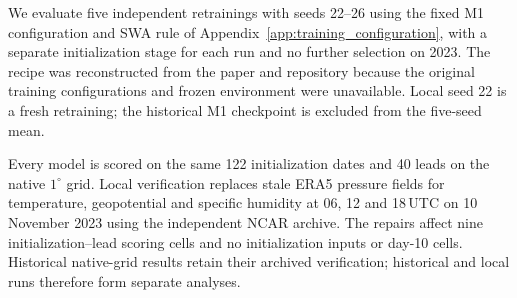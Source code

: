 \documentclass{article}
\newcommand{\vfourchange}[1]{{\color{blue}#1}}
\newif\ifvfivechanges
\begin{document}
\ifvfivechanges
\par\begingroup\color{vfiveDeleted}\noindent
\sout{We evaluate five fresh retrainings of the M1 configuration with seeds 22--26, each with its own 500-update warm-up and 2,000-update main stage. They hold fixed the selected training data (2015--2021), $K=20$, batch size four, $d_{\mathrm{inner}}=16$, architecture, loss, optimizer and learning-rate schedules in Appendix~\mbox{\ref{app:training_configuration}}. Each SWA averages main-stage checkpoints 500, 1,000, 1,500 and 2,000. The recipe was reconstructed from the paper and repository configurations because the original training configurations and frozen environment were unavailable for this replication. Local seed 22 is a fresh retraining, not the historical selected checkpoint; the latter is not included in the five-seed mean. The configuration is fixed across seeds without further selection on 2023.}
\par\endgroup
\fi
\vfourchange{We evaluate five independent retrainings with seeds 22--26 using the fixed M1 configuration and SWA rule of Appendix~\ref{app:training_configuration}, with a separate initialization stage for each run and no further selection on 2023. The recipe was reconstructed from the paper and repository because the original training configurations and frozen environment were unavailable. Local seed 22 is a fresh retraining; the historical M1 checkpoint is excluded from the five-seed mean.}

\vfourchange{Every model is scored on the same 122 initialization dates and 40 leads on the native $1^\circ$ grid. Local verification replaces stale ERA5 pressure fields for temperature, geopotential and specific humidity at 06, 12 and 18\,UTC on 10 November 2023 using the independent NCAR archive. The repairs affect nine initialization--lead scoring cells and no initialization inputs or day-10 cells. Historical native-grid results retain their archived verification; historical and local runs therefore form separate analyses.}
\end{document}

